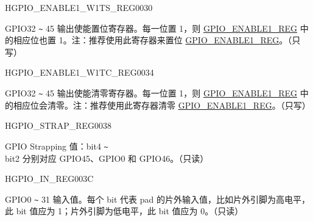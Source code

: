 \begin{register}{H}{GPIO\_ENABLE1\_W1TS\_REG}{\hexprefix{}0030}\label{regdesc:GPIOENABLE1W1TSREG}
%
%
\regnewline%
\begin{regdesc}\begin{reglist}
\label{fielddesc:GPIOENABLE1W1TS}\item [GPIO\_ENABLE1\_W1TS] GPIO32 \verb+~+ 45 输出使能置位寄存器。每一位置 1，则 \hyperref[regdesc:GPIOENABLE1REG]{GPIO\_ENABLE1\_REG} 中的相应位也置 1。注：推荐使用此寄存器来置位 \hyperref[regdesc:GPIOENABLE1REG]{GPIO\_ENABLE1\_REG}。（只写）
\end{reglist}\end{regdesc}
\end{register}


\begin{register}{H}{GPIO\_ENABLE1\_W1TC\_REG}{\hexprefix{}0034}\label{regdesc:GPIOENABLE1W1TCREG}
%
%
\regnewline%
\begin{regdesc}\begin{reglist}
\label{fielddesc:GPIOENABLE1W1TC}\item [GPIO\_ENABLE1\_W1TC] GPIO32 \verb+~+ 45 输出使能清零寄存器。每一位置 1，则 \hyperref[regdesc:GPIOENABLE1REG]{GPIO\_ENABLE1\_REG} 中的相应位会清零。注：推荐使用此寄存器清零 \hyperref[regdesc:GPIOENABLE1REG]{GPIO\_ENABLE1\_REG}。（只写）
\end{reglist}\end{regdesc}
\end{register}


\begin{register}{H}{GPIO\_STRAP\_REG}{\hexprefix{}0038}\label{regdesc:GPIOSTRAPREG}
%
%
\regnewline%
\begin{regdesc}\begin{reglist}
\label{fielddesc:GPIOSTRAPPING}\item [GPIO\_STRAPPING] GPIO Strapping 值：bit4 \verb+~+ bit2 分别对应 GPIO45、GPIO0 和 GPIO46。（只读）
\end{reglist}\end{regdesc}
\end{register}


\begin{register}{H}{GPIO\_IN\_REG}{\hexprefix{}003C}\label{regdesc:GPIOINREG}
%
\regnewline%
\begin{regdesc}\begin{reglist}
\label{fielddesc:GPIOINDATANEXT}\item [GPIO\_IN\_DATA\_NEXT] GPIO0 \verb+~+ 31 输入值。每个 bit 代表 pad 的片外输入值，比如片外引脚为高电平，此 bit 值应为 1；片外引脚为低电平，此 bit 值应为 0。（只读）
\end{reglist}\end{regdesc}
\end{register}


